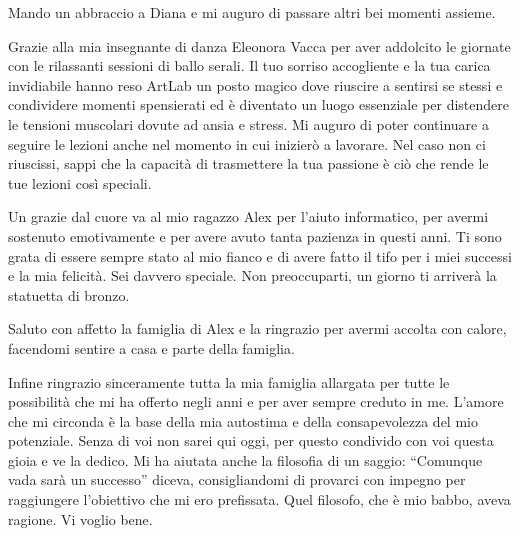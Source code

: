 \documentclass[12pt,a4paper,twoside]{article}
\begin{document}
Mando un abbraccio a Diana e mi auguro di passare altri bei momenti assieme.

Grazie alla mia insegnante di danza Eleonora Vacca per aver addolcito le giornate con le rilassanti sessioni di ballo serali. Il tuo sorriso accogliente e la tua carica invidiabile hanno reso ArtLab un posto magico dove riuscire a sentirsi se stessi e condividere momenti spensierati ed è diventato un luogo essenziale per distendere le tensioni muscolari dovute ad ansia e stress. Mi auguro di poter continuare a seguire le lezioni anche nel momento in cui inizierò a lavorare. Nel caso non ci riuscissi, sappi che la capacità di trasmettere la tua passione è ciò che rende le tue lezioni così speciali.

Un grazie dal cuore va al mio ragazzo Alex per l'aiuto informatico, per avermi sostenuto emotivamente e per avere avuto tanta pazienza in questi anni. Ti sono grata di essere sempre stato al mio fianco e di avere fatto il tifo per i miei successi e la mia felicità. Sei davvero speciale. Non preoccuparti, un giorno ti arriverà la statuetta di bronzo.

Saluto con affetto la famiglia di Alex e la ringrazio per avermi accolta con calore, facendomi sentire a casa e parte della famiglia.

Infine ringrazio sinceramente tutta la mia famiglia allargata per tutte le possibilità che mi ha offerto negli anni e per aver sempre creduto in me. L'amore che mi circonda è la base della mia autostima e della consapevolezza del mio potenziale. Senza di voi non sarei qui oggi, per questo condivido con voi questa gioia e ve la dedico. Mi ha aiutata anche la filosofia di un saggio: ``Comunque vada sarà un successo'' diceva, consigliandomi di provarci con impegno per raggiungere l'obiettivo che mi ero prefissata. Quel filosofo, che è mio babbo, aveva ragione. Vi voglio bene.
\end{document}
